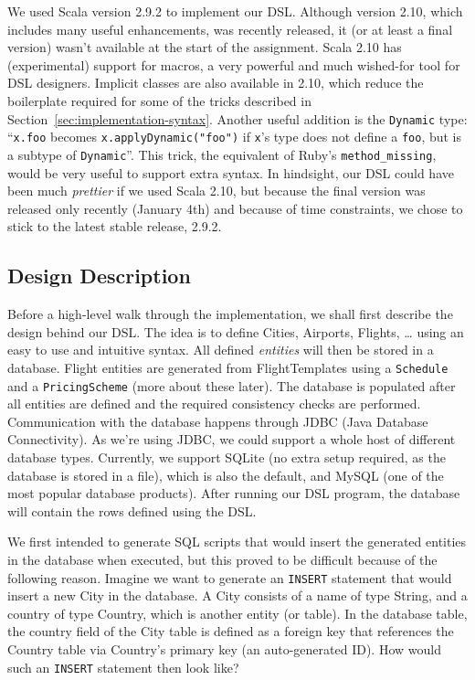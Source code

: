 \documentclass[a4paper]{article}
\newcommand{\cc}[1]{\texttt{#1}}
\renewcommand{\sc}[1]{\lstinline{#1}}
\begin{document}
We used Scala version 2.9.2 to implement our DSL.
Although version 2.10, which includes many useful enhancements, was recently released, it (or at least a final version) wasn't available at the start of the assignment.
Scala 2.10 has (experimental) support for macros, a very powerful and much wished-for tool for DSL designers.
Implicit classes are also available in 2.10, which reduce the boilerplate required for some of the tricks described in Section~\ref{sec:implementation-syntax}.
Another useful addition is the \cc{Dynamic} type: ``\sc{x.foo} becomes \sc{x.applyDynamic("foo")} if \sc{x}'s type does not define a \sc{foo}, but is a subtype of \cc{Dynamic}''.
This trick, the equivalent of Ruby's \cc{method\_missing}, would be very useful to support extra syntax.
In hindsight, our DSL could have been much \emph{prettier} if we used Scala 2.10, but because the final version was released only recently (January 4th) and because of time constraints, we chose to stick to the latest stable release, 2.9.2.

\subsection{Design Description}
\label{sec:design-description}


Before a high-level walk through the implementation, we shall first describe the design behind our DSL.
The idea is to define Cities, Airports, Flights, \ldots{} using an easy to use and intuitive syntax.
All defined \emph{entities} will then be stored in a database.
Flight entities are generated from FlightTemplates using a \cc{Schedule} and a \cc{Pricing\-Scheme} (more about these later).
The database is populated after all entities are defined and the required consistency checks are performed.
Communication with the database happens through \textsc{JDBC} (Java Database Connectivity).
As we're using \textsc{JDBC}, we could support a whole host of different database types.
Currently, we support SQLite (no extra setup required, as the database is stored in a file), which is also the default, and MySQL (one of the most popular database products).
After running our DSL program, the database will contain the rows defined using the DSL.\@

We first intended to generate SQL scripts that would insert the generated entities in the database when executed, but this proved to be difficult because of the following reason.
Imagine we want to generate an \cc{INSERT} statement that would insert a new City in the database.
A City consists of a name of type String, and a country of type Country, which is another entity (or table).
In the database table, the country field of the City table is defined as a foreign key that references the Country table via Country's primary key (an auto-generated ID).
How would such an \cc{INSERT} statement then look like?
\end{document}
